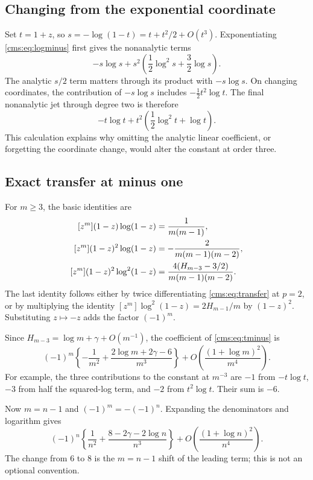 \subsection{Changing from the exponential coordinate}
Set $t=1+z$, so $s=-\log(1-t)=t+t^2/2+O(t^3)$. Exponentiating \eqref{cms:eq:logminus} first gives the nonanalytic terms
\[
-s\log s+s^2\left(\frac12\log^2s+\frac32\log s\right).
\]
The analytic $s/2$ term matters through its product with $-s\log s$. On changing coordinates, the contribution of $-s\log s$ includes $-\tfrac12t^2\log t$. The final nonanalytic jet through degree two is therefore
\begin{equation}\label{cms:eq:tminus}
-t\log t+t^2\left(\frac12\log^2t+\log t\right).
\end{equation}
This calculation explains why omitting the analytic linear coefficient, or forgetting the coordinate change, would alter the constant at order three.

\subsection{Exact transfer at minus one}
For $m\geq3$, the basic identities are
\begin{align}\label{cms:eq:exactlogidentities}
[z^m](1-z)\log(1-z)&=\frac1{m(m-1)},\\
[z^m](1-z)^2\log(1-z)&=-\frac2{m(m-1)(m-2)},\notag\\
[z^m](1-z)^2\log^2(1-z)&=
\frac{4(H_{m-3}-3/2)}{m(m-1)(m-2)}.\notag
\end{align}
The last identity follows either by twice differentiating \eqref{cms:eq:transfer} at $p=2$, or by multiplying the identity $[z^m]\log^2(1-z)=2H_{m-1}/m$ by $(1-z)^2$. Substituting $z\mapsto-z$ adds the factor $(-1)^m$.

Since $H_{m-3}=\log m+\gamma+O(m^{-1})$, the coefficient of \eqref{cms:eq:tminus} is
\begin{equation}\label{cms:eq:minusm}
(-1)^m\left\{-\frac1{m^2}
+\frac{2\log m+2\gamma-6}{m^3}\right\}
+O\!\left(\frac{(1+\log m)^2}{m^4}\right).
\end{equation}
For example, the three contributions to the constant at $m^{-3}$ are $-1$ from $-t\log t$, $-3$ from half the squared-log term, and $-2$ from $t^2\log t$. Their sum is $-6$.

Now $m=n-1$ and $(-1)^m=-(-1)^n$. Expanding the denominators and logarithm gives
\begin{equation}\label{cms:eq:minusn}
(-1)^n\left\{\frac1{n^2}
+\frac{8-2\gamma-2\log n}{n^3}\right\}
+O\!\left(\frac{(1+\log n)^2}{n^4}\right).
\end{equation}
The change from $6$ to $8$ is the $m=n-1$ shift of the leading term; this is not an optional convention.


